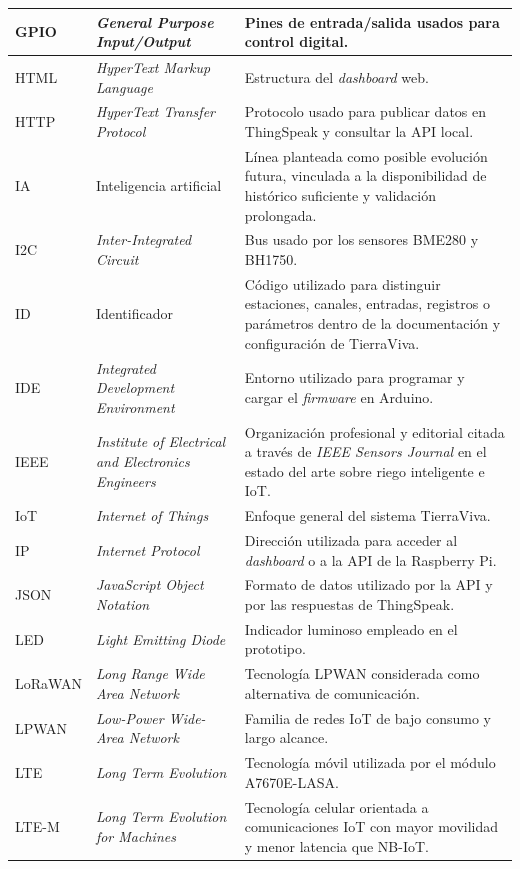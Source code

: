\begin{longtable}{|p{}|p{}|p{}|}
\hline
GPIO & \textit{General Purpose Input/Output} & Pines de entrada/salida usados para control digital. \\
\hline
HTML & \textit{HyperText Markup Language} & Estructura del \textit{dashboard} web. \\
\hline
HTTP & \textit{HyperText Transfer Protocol} & Protocolo usado para publicar datos en ThingSpeak y consultar la API local. \\
\hline
IA & Inteligencia artificial & Línea planteada como posible evolución futura, vinculada a la disponibilidad de histórico suficiente y validación prolongada. \\
\hline
I2C & \textit{Inter-Integrated Circuit} & Bus usado por los sensores BME280 y BH1750. \\
\hline
ID & Identificador & Código utilizado para distinguir estaciones, canales, entradas, registros o parámetros dentro de la documentación y configuración de TierraViva. \\
\hline
IDE & \textit{Integrated Development Environment} & Entorno utilizado para programar y cargar el \textit{firmware} en Arduino. \\
\hline
IEEE & \textit{Institute of Electrical and Electronics Engineers} & Organización profesional y editorial citada a través de \textit{IEEE Sensors Journal} en el estado del arte sobre riego inteligente e IoT. \\
\hline
IoT & \textit{Internet of Things} & Enfoque general del sistema TierraViva. \\
\hline
IP & \textit{Internet Protocol} & Dirección utilizada para acceder al \textit{dashboard} o a la API de la Raspberry Pi. \\
\hline
JSON & \textit{JavaScript Object Notation} & Formato de datos utilizado por la API y por las respuestas de ThingSpeak. \\
\hline
LED & \textit{Light Emitting Diode} & Indicador luminoso empleado en el prototipo. \\
\hline
LoRaWAN & \textit{Long Range Wide Area Network} & Tecnología LPWAN considerada como alternativa de comunicación. \\
\hline
LPWAN & \textit{Low-Power Wide-Area Network} & Familia de redes IoT de bajo consumo y largo alcance. \\
\hline
LTE & \textit{Long Term Evolution} & Tecnología móvil utilizada por el módulo A7670E-LASA. \\
\hline
LTE-M & \textit{Long Term Evolution for Machines} & Tecnología celular orientada a comunicaciones IoT con mayor movilidad y menor latencia que NB-IoT. \\

\end{longtable}

